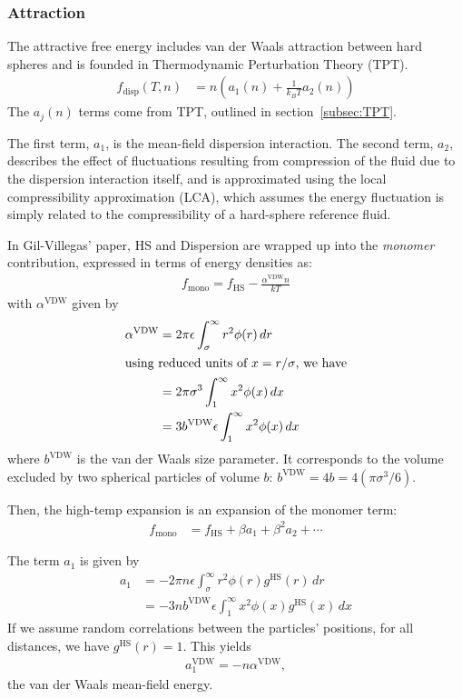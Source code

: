 \documentclass[letterpaper,twocolumn,amsmath,amssymb,prb]{revtex4-1}
\newcommand{\kT}{\ensuremath{k_BT}}
\newcommand{\fdisp}{\ensuremath{f_\text{disp}(T,n)}}
\newcommand{\1}{\ensuremath{\textbf{r}_1}}
\newcommand{\2}{\ensuremath{\textbf{r}_2}}
\newcommand{\3}{\ensuremath{\textbf{r}_3}}
\newcommand{\4}{\ensuremath{\textbf{r}_4}}
\begin{document}
\subsubsection{Attraction}\label{sub2sec:disp}
The attractive free energy includes van der Waals attraction between hard spheres and is founded in Thermodynamic Perturbation Theory (TPT).
\begin{align}
  \fdisp &= n \left( a_1(n) + \frac{1}{\kT}a_2(n) \right)
\end{align}
The $a_j(n)$ terms come from TPT, outlined in section~\ref{subsec:TPT}.

The first term, $a_1$, is the mean-field dispersion interaction. The second term, $a_2$, describes the effect of fluctuations resulting from compression of the fluid due to the dispersion interaction itself, and is approximated using the local compressibility approximation (LCA), which assumes the energy fluctuation is simply related to the compressibility of a hard-sphere reference fluid.\cite{Barker76}

In Gil-Villegas' paper,\cite{gil-villegas97} HS and Dispersion are wrapped up into the
\textit{monomer} contribution, expressed in terms of energy densities
as:
\begin{align}
  f_\text{mono} = f_\text{HS} - \frac{\alpha^\text{VDW}n}{kT}
\end{align}
with $\alpha^\text{VDW}$ given by
\begin{align}
  \alpha^\text{VDW} &= 2\pi\epsilon\int_\sigma^\infty r^2\phi(r)\,dr \\
  \intertext{using reduced units of $x = r/\sigma$, we have}
  &= 2\pi\sigma^3\int_1^\infty x^2\phi(x)\,dx \\
  &= 3b^\text{VDW}\epsilon\int_1^\infty x^2\phi(x)\,dx
\end{align}
where $b^\text{VDW}$ is the van der Waals size parameter. It corresponds to the volume excluded by two spherical particles of volume $b$: $b^\text{VDW} = 4b = 4\left(\pi\sigma^3/6\right)$.

Then, the high-temp expansion is an expansion of the monomer term:
\begin{align}
  f_\text{mono} &= f_\text{HS} + \beta a_1 + \beta^2 a_2 + \cdots
\end{align}

The term $a_1$ is given by
\begin{align}
  a_1 &= -2\pi n \epsilon\int_\sigma^\infty r^2\phi(r)g^\text{HS}(r)\,dr \\
  &= -3 n  b^\text{VDW}\epsilon\int_1^\infty x^2\phi(x)g^\text{HS}(x)\,dx
\end{align}
If we assume random correlations between the particles' positions, for all distances, we have $g^\text{HS}(r) = 1$. This yields
\begin{align}
  a_1^\text{VDW} = - n \alpha^\text{VDW},
\end{align}
the van der Waals mean-field energy.
\end{document}

